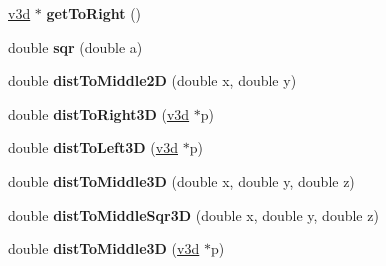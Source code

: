 \begin{DoxyCompactItemize}
\item 
\hypertarget{class_track_segment_a9145d309ffae462cb205a093a0ae8e80}{\hyperlink{classv3d}{v3d} $\ast$ {\bfseries get\-To\-Right} ()}\label{class_track_segment_a9145d309ffae462cb205a093a0ae8e80}

\item 
\hypertarget{class_track_segment_a12456a244ef7090e972ce04b8b8ea8ba}{double {\bfseries sqr} (double a)}\label{class_track_segment_a12456a244ef7090e972ce04b8b8ea8ba}

\item 
\hypertarget{class_track_segment_abbd7ac00fd16f7d450efc9ca8a741edf}{double {\bfseries dist\-To\-Middle2\-D} (double x, double y)}\label{class_track_segment_abbd7ac00fd16f7d450efc9ca8a741edf}

\item 
\hypertarget{class_track_segment_a37169296bd1958eb0b9a5f6008105437}{double {\bfseries dist\-To\-Right3\-D} (\hyperlink{classv3d}{v3d} $\ast$p)}\label{class_track_segment_a37169296bd1958eb0b9a5f6008105437}

\item 
\hypertarget{class_track_segment_ab56cec401938556b708dad220e3b8a42}{double {\bfseries dist\-To\-Left3\-D} (\hyperlink{classv3d}{v3d} $\ast$p)}\label{class_track_segment_ab56cec401938556b708dad220e3b8a42}

\item 
\hypertarget{class_track_segment_ae07f4a0c285c11988d1f13d2401a2844}{double {\bfseries dist\-To\-Middle3\-D} (double x, double y, double z)}\label{class_track_segment_ae07f4a0c285c11988d1f13d2401a2844}

\item 
\hypertarget{class_track_segment_a5e3c09438d06857a04c27d4f6ff09822}{double {\bfseries dist\-To\-Middle\-Sqr3\-D} (double x, double y, double z)}\label{class_track_segment_a5e3c09438d06857a04c27d4f6ff09822}

\item 
\hypertarget{class_track_segment_ab9ed54ed31775b0ebcb467054a283c45}{double {\bfseries dist\-To\-Middle3\-D} (\hyperlink{classv3d}{v3d} $\ast$p)}\label{class_track_segment_ab9ed54ed31775b0ebcb467054a283c45}

\end{DoxyCompactItemize}
